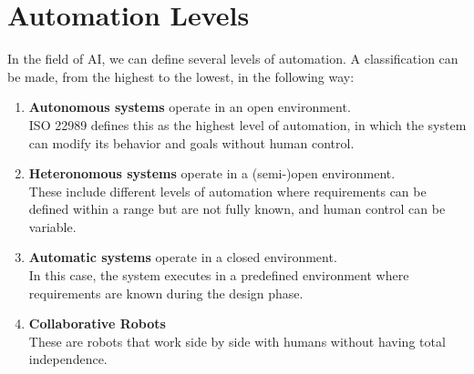 \section{Automation Levels}
In the field of AI, we can define several levels of automation. A classification can be made, from the highest to the lowest, in the following way:
\begin{enumerate}
    \item \textbf{Autonomous systems} operate in an open environment. \\
        ISO 22989 defines this as the highest level of automation, in which the system can modify its behavior and goals without human control.
    \item \textbf{Heteronomous systems} operate in a (semi-)open environment. \\
        These include different levels of automation where requirements can be defined within a range but are not fully known, and human control can be variable.
    \item \textbf{Automatic systems} operate in a closed environment. \\
        In this case, the system executes in a predefined environment where requirements are known during the design phase.
    \item \textbf{Collaborative Robots} \\
        These are robots that work side by side with humans without having total independence.
\end{enumerate}

